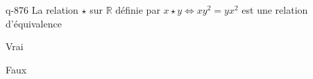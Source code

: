 \begin{truefalse}{q-876}
La relation $\star$ sur $\mathbb R$ définie par $x\star y \iff xy^2=yx^2$ est une relation d'équivalence
\item* Vrai
\item Faux
\end{truefalse}

